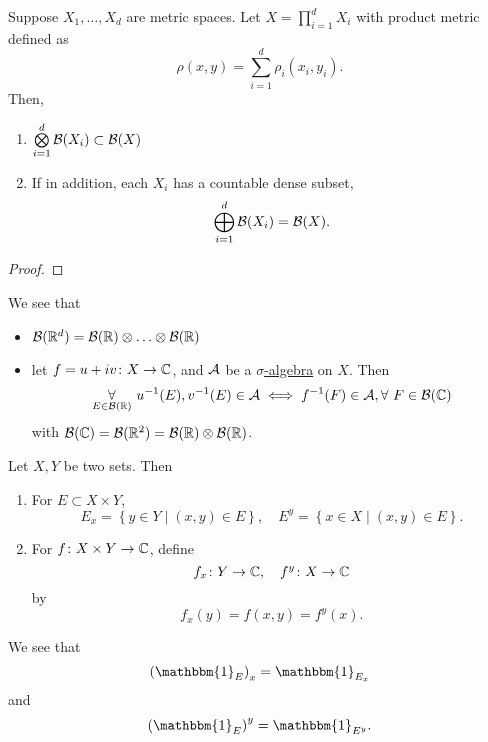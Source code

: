 \begin{theorem}
	Suppose \(X_1, \ldots , X_d \) are metric spaces. Let \(X = \prod\limits_{i=1}^{d} X_{i}\) with product metric defined as
	\[
		\rho (x, y) = \sum\limits_{i=1}^{d} \rho _{i}(x_{i}, y_{i}).
	\]
	Then,
	\begin{enumerate}
		\item \(\bigotimes\limits_{i=1}^{d}\mathcal{\MakeUppercase{b}} (X_{i})\subset \mathcal{\MakeUppercase{b}} (X)\)
		\item If in addition, each \(X_{i}\) has a countable dense subset,
		      \[
			      \bigoplus\limits_{i=1}^{d}\mathcal{\MakeUppercase{b}} (X_{i}) = \mathcal{\MakeUppercase{b}} (X).
		      \]
	\end{enumerate}
\end{theorem}
\begin{proof}
\end{proof}

\begin{remark}
	We see that
	\begin{itemize}
		\item \(\mathcal{\MakeUppercase{b}} (\mathbb{\MakeUppercase{r}} ^d) = \mathcal{\MakeUppercase{b}} (\mathbb{\MakeUppercase{r}} )\otimes \ldots \otimes \mathcal{\MakeUppercase{b}} (\mathbb{\MakeUppercase{r}} ) \)
		\item let \(f = u + iv\colon X\to \mathbb{\MakeUppercase{c}} \), and \(\mathcal{\MakeUppercase{a}} \) be a \hyperref[def:sigma-algebra]{\(\sigma\)-algebra} on \(X\). Then
		      \[
			      \underset{E\in \mathcal{\MakeUppercase{b}} (\mathbb{\MakeUppercase{r}} )}{\forall }\ u^{-1} (E), v^{-1} (E)\in \mathcal{\MakeUppercase{a}}
			      \iff
			      f^{-1} (F)\in \mathcal{\MakeUppercase{a}}, \forall\ F\in \mathcal{\MakeUppercase{b}} (\mathbb{\MakeUppercase{c}} )
		      \]
		      with \(\mathcal{\MakeUppercase{b}} (\mathbb{\MakeUppercase{c}} ) = \mathcal{\MakeUppercase{b}} (\mathbb{\MakeUppercase{r}} ^2) = \mathcal{\MakeUppercase{b}} (\mathbb{\MakeUppercase{r}} )\otimes \mathcal{\MakeUppercase{b}} (\mathbb{\MakeUppercase{r}} )\).
	\end{itemize}
\end{remark}

\begin{definition}
	Let \(X, Y\) be two sets. Then
	\begin{enumerate}
		\item For \(E\subset X\times Y\),
		      \[
			      E_x = \left\{y\in Y \mid (x, y)\in E\right\},\quad E^y = \left\{x\in X \mid (x, y)\in E\right\}.
		      \]
		\item For \(f\colon X\times Y\to \mathbb{\MakeUppercase{c}} \), define
		      \[
			      f_x\colon Y\to \mathbb{\MakeUppercase{c}} ,\quad f^y\colon X\to \mathbb{\MakeUppercase{c}}
		      \]
		      by
		      \[
			      f_x(y) = f(x, y) = f^y(x).
		      \]
	\end{enumerate}
\end{definition}
\begin{eg}
	We see that
	\[
		\left(\mathbbm{1}_{E} \right)_x = \mathbbm{1}_{E_x}
	\]
	and
	\[
		\left(\mathbbm{1}_{E} \right)^y = \mathbbm{1}_{E^y}.
	\]
\end{eg}

